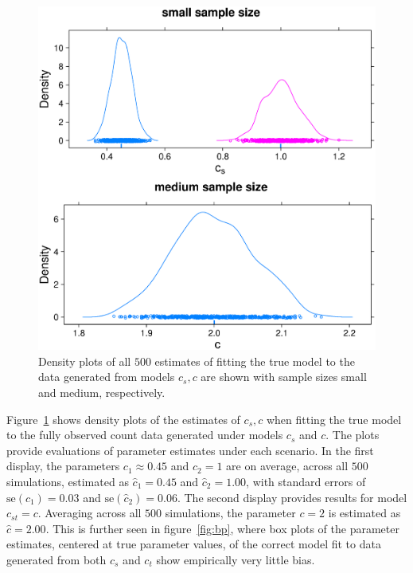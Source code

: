 \begin{figure}
  \centering
  \includegraphics[scale=0.5]{nonem}
  \caption{Density plots of all $500$ estimates of fitting the true model to the data generated from models $c_s,c$ are shown with sample sizes small and medium, respectively.}
  \label{fig:nonem}
\end{figure}

Figure~\ref{fig:nonem} shows density plots of the estimates of $c_s, c$ when fitting the true model to the fully observed count data generated under models $c_s$ and $c$.  The plots provide evaluations of parameter estimates under each scenario.  In the first display, the parameters $c_1 \approx 0.45$ and $c_2 = 1$ are on average, across all $500$ simulations, estimated as $\hat{c}_1 = 0.45$ and $\hat{c}_2 = 1.00$, with standard errors of $\text{se}(\hat{c}_1) = 0.03$ and $\text{se}(\hat{c}_2) = 0.06$.  The second display provides results for model $c_{st} = c$.  Averaging across all $500$ simulations, the parameter $c=2$ is estimated as $\hat{c} = 2.00$.  This is further seen in figure~\ref{fig:bp}, where box plots of the parameter estimates, centered at true parameter values, of the correct model fit to data generated from both $c_s$ and $c_t$ show empirically very little bias.

